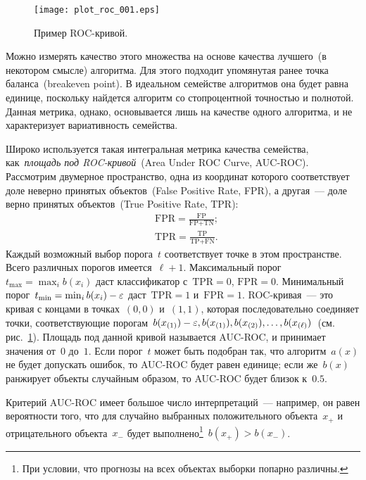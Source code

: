 \documentclass[12pt,fleqn]{article}
\begin{document}
\begin{figure}[t]
    \centering
    \texttt{[image: plot\_roc\_001.eps]}
    \caption{Пример ROC-кривой.}
    \label{fig:roc}
\end{figure}

Можно измерять качество этого множества на основе качества лучшего~(в некотором смысле) алгоритма.
Для этого подходит упомянутая ранее точка баланса~(breakeven point).
В идеальном семействе алгоритмов она будет равна единице, поскольку найдется
алгоритм со стопроцентной точностью и полнотой.
Данная метрика, однако, основывается лишь на качестве одного алгоритма,
и не характеризует вариативность семейства.

Широко используется такая интегральная метрика качества семейства,
как~\emph{площадь под ROC-кривой}~(Area Under ROC Curve, AUC-ROC).
Рассмотрим двумерное пространство, одна из координат которого соответствует
доле неверно принятых объектов~(False Positive Rate, FPR),
а другая~--- доле верно принятых объектов~(True Positive Rate, TPR):
\begin{align*}
    &\text{FPR}
    =
    \frac{
        \text{FP}
    }{
        \text{FP} + \text{TN}
    };\\
    &\text{TPR}
    =
    \frac{
        \text{TP}
    }{
        \text{TP} + \text{FN}
    }.
\end{align*}
Каждый возможный выбор порога~$t$ соответствует точке в этом пространстве.
Всего различных порогов имеется~$\ell + 1$.
Максимальный порог~$t_{\max} = \max_{i} b(x_i)$ даст классификатор
с~$\text{TPR} = 0$, $\text{FPR} = 0$.
Минимальный порог~$t_{\min} = \min_{i} b(x_i) - \varepsilon$ даст~$\text{TPR} = 1$
и~$\text{FPR} = 1$.
ROC-кривая~--- это кривая с концами в точках~$(0, 0)$ и~$(1, 1)$,
которая последовательно соединяет точки, соответствующие
порогам~$b(x_{(1)}) - \varepsilon, b(x_{(1)}), b(x_{(2)}), \dots, b(x_{(\ell)})$~(см. рис.~\ref{fig:roc}).
Площадь под данной кривой называется AUC-ROC, и принимает значения от~$0$ до~$1$.
Если порог~$t$ может быть подобран так, что алгоритм~$a(x)$ не будет допускать ошибок,
то AUC-ROC будет равен единице;
если же~$b(x)$ ранжирует объекты случайным образом, то AUC-ROC будет близок к~$0.5$.

Критерий AUC-ROC имеет большое число интерпретаций~--- например,
он равен вероятности того, что для случайно выбранных
положительного объекта~$x_+$ и отрицательного объекта~$x_-$
будет выполнено\footnote{При условии, что прогнозы на всех объектах выборки попарно различны.}~$b(x_+) > b(x_-)$.
\end{document}
